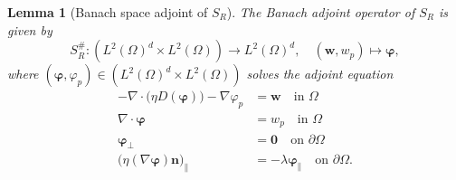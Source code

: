 \documentclass[final,leqno]{scrarticle}
\newtheorem{lemma}[theorem]{Lemma}
\newcommand{\lzo}{L^2(\Omega)}
\newcommand{\lzd}{{L^2(\Omega)^d}}
\begin{document}
\begin{lemma}[Banach space adjoint of $S_R$]
\label{lemma:banach_robin}
    The Banach adjoint operator of $S_R$ is given by
    \begin{displaymath}
        S_R^{\#}:\left(\lzd \times \lzo\right) \rightarrow \lzd, \quad (\mathbf{w},w_p) \mapsto \boldsymbol{\varphi},
    \end{displaymath} where $\left(\boldsymbol{\varphi},\varphi_p\right)\in \left(\lzd \times \lzo\right)$ solves the adjoint equation
      \begin{equation} \label{eq-adjoint}
 \begin{split}
  -\nabla \cdot \big( \eta D(\boldsymbol{\varphi}) \big) - \nabla \varphi_p &= \mathbf{w} \quad \text{in } \Omega\\
  \nabla \cdot \boldsymbol{\varphi} &= w_p \quad \text{in } \Omega\\
  \boldsymbol{\varphi}_{\bot} &= \mathbf{0} \quad \text{on } \partial\Omega \\
  \big(\eta (\nabla \boldsymbol{\varphi})\mathbf{n} \big)_{\parallel} &= -\lambda \boldsymbol{\varphi}_{\parallel}\quad \text{on } \partial\Omega.
  \end{split}
\end{equation}
\end{lemma}
\end{document}
